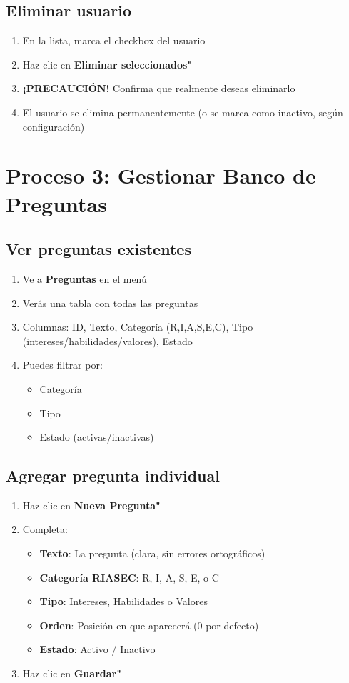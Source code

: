\documentclass[12pt, a4paper]{report}
\begin{document}
\subsection{Eliminar usuario}
\begin{enumerate}
    \item En la lista, marca el checkbox del usuario
    \item Haz clic en \textbf{Eliminar seleccionados"}
    \item \textbf{¡PRECAUCIÓN!} Confirma que realmente deseas eliminarlo
    \item El usuario se elimina permanentemente (o se marca como inactivo, según configuración)
\end{enumerate}

\section{Proceso 3: Gestionar Banco de Preguntas}

\subsection{Ver preguntas existentes}
\begin{enumerate}
    \item Ve a \textbf{Preguntas} en el menú
    \item Verás una tabla con todas las preguntas
    \item Columnas: ID, Texto, Categoría (R,I,A,S,E,C), Tipo (intereses/habilidades/valores), Estado
    \item Puedes filtrar por:
    \begin{itemize}
        \item Categoría
        \item Tipo
        \item Estado (activas/inactivas)
    \end{itemize}
\end{enumerate}

\subsection{Agregar pregunta individual}
\begin{enumerate}
    \item Haz clic en \textbf{Nueva Pregunta"}
    \item Completa:
    \begin{itemize}
        \item \textbf{Texto}: La pregunta (clara, sin errores ortográficos)
        \item \textbf{Categoría RIASEC}: R, I, A, S, E, o C
        \item \textbf{Tipo}: Intereses, Habilidades o Valores
        \item \textbf{Orden}: Posición en que aparecerá (0 por defecto)
        \item \textbf{Estado}: Activo / Inactivo
    \end{itemize}
    \item Haz clic en \textbf{Guardar"}
\end{enumerate}
\end{document}

